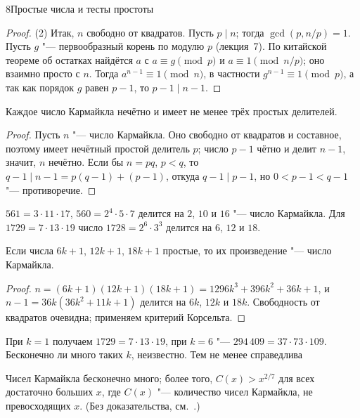 \begin{lecture}{8}{Простые числа и тесты простоты}
\begin{proof}
(2) Итак, $n$ свободно от квадратов. Пусть $p \mid n$; тогда $\gcd(p, n/p) = 1$. Пусть $g$ "---
первообразный корень по модулю $p$ (лекция~7). По китайской теореме об остатках найдётся $a$
с $a \equiv g \pmod p$ и $a \equiv 1 \pmod{n/p}$; оно взаимно просто с $n$. Тогда
$a^{n-1} \equiv 1 \pmod n$, в частности $g^{n-1} \equiv 1 \pmod p$, а так как порядок $g$
равен $p - 1$, то $p - 1 \mid n - 1$.
\end{proof}

\begin{corollary}\label{l8:carm-odd}
Каждое число Кармайкла нечётно и имеет не менее трёх простых делителей.
\end{corollary}

\begin{proof}
Пусть $n$ "--- число Кармайкла. Оно свободно от квадратов и составное, поэтому имеет нечётный
простой делитель $p$; число $p - 1$ чётно и делит $n - 1$, значит, $n$ нечётно. Если бы
$n = pq$, $p < q$, то $q - 1 \mid n - 1 = p(q - 1) + (p - 1)$, откуда $q - 1 \mid p - 1$, но
$0 < p - 1 < q - 1$ "--- противоречие.
\end{proof}

\begin{example}
$561 = 3 \cdot 11 \cdot 17$, $560 = 2^4 \cdot 5 \cdot 7$ делится на $2$, $10$ и $16$ "---
число Кармайкла. Для $1729 = 7 \cdot 13 \cdot 19$ число $1728 = 2^6 \cdot 3^3$ делится на
$6$, $12$ и $18$.
\end{example}

\begin{proposition}[Чернек, 1939]\label{l8:chernick}
Если числа $6k + 1$, $12k + 1$, $18k + 1$ простые, то их произведение "--- число Кармайкла.
\end{proposition}

\begin{proof}
$n = (6k + 1)(12k + 1)(18k + 1) = 1296k^3 + 396k^2 + 36k + 1$, и $n - 1 = 36k(36k^2 + 11k + 1)$
делится на $6k$, $12k$ и $18k$. Свободность от квадратов очевидна; применяем критерий
Корсельта.
\end{proof}

При $k = 1$ получаем $1729 = 7 \cdot 13 \cdot 19$, при $k = 6$ "--- $294\,409 = 37 \cdot 73 \cdot 109$.
Бесконечно ли много таких $k$, неизвестно. Тем не менее справедлива

\begin{theorem}
Чисел Кармайкла бесконечно много; более того, $C(x) > x^{2/7}$ для всех достаточно больших
$x$, где $C(x)$ "--- количество чисел Кармайкла, не превосходящих $x$. \textup{(Без
доказательства, см.~\cite{alford-granville-pomerance}.)}
\end{theorem}


\end{lecture}
